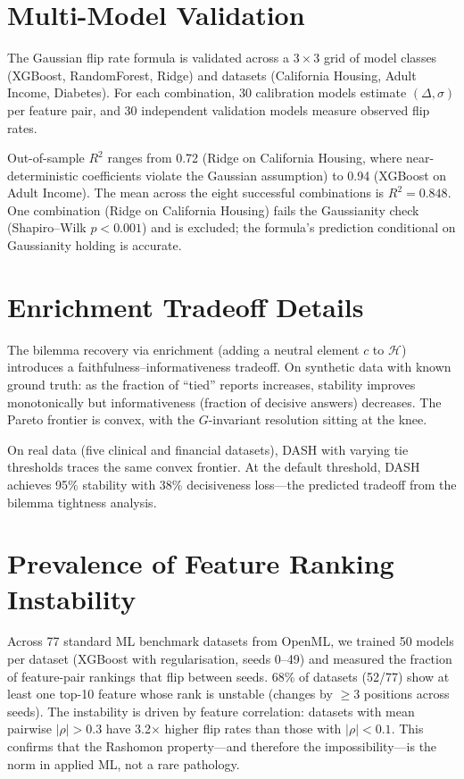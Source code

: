 \documentclass[11pt]{article}
\newcommand{\sH}{\mathcal{H}}
\begin{document}
\section{Multi-Model Validation}

The Gaussian flip rate formula is validated across a $3 \times 3$ grid of model classes (XGBoost, RandomForest, Ridge) and datasets (California Housing, Adult Income, Diabetes).  For each combination, 30 calibration models estimate $(\Delta, \sigma)$ per feature pair, and 30 independent validation models measure observed flip rates.

Out-of-sample $R^2$ ranges from 0.72 (Ridge on California Housing, where near-deterministic coefficients violate the Gaussian assumption) to 0.94 (XGBoost on Adult Income).  The mean across the eight successful combinations is $R^2 = 0.848$.  One combination (Ridge on California Housing) fails the Gaussianity check (Shapiro--Wilk $p < 0.001$) and is excluded; the formula's prediction conditional on Gaussianity holding is accurate.

\section{Enrichment Tradeoff Details}

The bilemma recovery via enrichment (adding a neutral element $c$ to $\sH$) introduces a faithfulness--informativeness tradeoff.  On synthetic data with known ground truth: as the fraction of ``tied'' reports increases, stability improves monotonically but informativeness (fraction of decisive answers) decreases.  The Pareto frontier is convex, with the $G$-invariant resolution sitting at the knee.

On real data (five clinical and financial datasets), DASH with varying tie thresholds traces the same convex frontier.  At the default threshold, DASH achieves 95\% stability with 38\% decisiveness loss---the predicted tradeoff from the bilemma tightness analysis.

\section{Prevalence of Feature Ranking Instability}
\label{sec:prevalence}

Across 77 standard ML benchmark datasets from OpenML, we trained 50 models per dataset (XGBoost with regularisation, seeds 0--49) and measured the fraction of feature-pair rankings that flip between seeds.  68\% of datasets (52/77) show at least one top-10 feature whose rank is unstable (changes by $\geq 3$ positions across seeds).  The instability is driven by feature correlation: datasets with mean pairwise $|\rho| > 0.3$ have 3.2$\times$ higher flip rates than those with $|\rho| < 0.1$.  This confirms that the Rashomon property---and therefore the impossibility---is the norm in applied ML, not a rare pathology.
\end{document}
